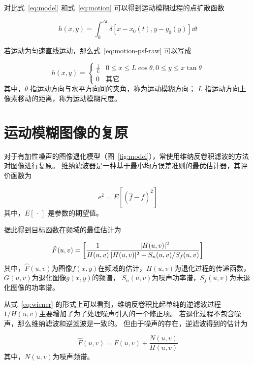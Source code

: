 \documentclass{hitgsrep}
\begin{document}
对比式~\eqref{eq:model} 和式~\eqref{eq:motion} 可以得到运动模糊过程的点扩散函数

\begin{equation}\label{eq:motion-psf-raw}
    h(x,y)=\int_0^{\Delta t}\delta[x-x_0(t),y-y_0(y)]\dd{t}
\end{equation}

若运动为匀速直线运动，那么式~\eqref{eq:motion-psf-raw} 可以写成\cite{_radon_2011}

\begin{equation}\label{eq:motion:psf}
    h(x,y)=\begin{cases}
        \frac{1}{L} & 0\le x\le L\cos\theta, 0\le y\le x\tan\theta\\
        0 & \text{其它}
    \end{cases}
\end{equation}
其中，$\theta$ 指运动方向与水平方向间的夹角，称为运动模糊方向；
$L$ 指运动方向上像素移动的距离，称为运动模糊尺度。

\section{运动模糊图像的复原}

对于有加性噪声的图像退化模型（图~\ref{fig:model}），常使用维纳反卷积滤波的方法对图像进行复原。
维纳滤波器是一种基于最小均方误差准则的最优估计器，其评价函数为

\begin{equation}
    e^2=E[(\hat{f}-f)^2]
\end{equation}
其中，$E[\,\cdot\,]$ 是参数的期望值。

据此得到目标函数在频域的最佳估计为\cite{masters_digital_2009}

\begin{equation}\label{eq:wiener}
    \hat{F}(u,v)=\qty[\frac{1}{H(u,v)}\frac{|H(u,v)|^2}{|H(u,v)|^2+S_n(u,v)/S_f(u,v)}]
\end{equation}
其中，$\hat{F}(u,v)$为图像$f(x,y)$在频域的估计，$H(u,v)$为退化过程的传递函数，$G(u,v)$为退化图像$g(x,y)$的频谱，
$S_n(u,v)$为噪声功率谱，$S_f(u,v)$为未退化图像的功率谱。

从式~\eqref{eq:wiener} 的形式上可以看到，维纳反卷积比起单纯的逆滤波过程$1/H(u,v)$主要增加了为了处理噪声引入的一个修正项。
若退化过程不包含噪声，那么维纳滤波和逆滤波是一致的。
但由于噪声的存在，逆滤波得到的估计为

\begin{equation}
    \hat{F}(u,v)=F(u,v)+\frac{N(u,v)}{H(u,v)}
\end{equation}
其中，$N(u,v)$为噪声频谱。
\end{document}
